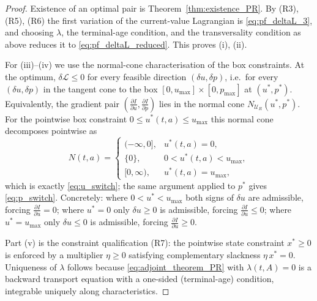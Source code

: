 \documentclass[10pt,a4paper]{amsart}
\begin{document}
\begin{proof}
Existence of an optimal pair is Theorem~\ref{thm:existence_PR}. By (R3),
(R5), (R6) the first variation of the current-value Lagrangian is
\eqref{eq:pf_deltaL_3}, and choosing $\lambda$, the terminal-age condition,
and the transversality condition as above reduces it to
\eqref{eq:pf_deltaL_reduced}. This proves (i), (ii).

For (iii)--(iv) we use the normal-cone characterisation of the box
constraints. At the optimum,
$\delta\mathcal L\le0$ for every feasible direction $(\delta u,\delta p)$,
i.e.\ for every $(\delta u,\delta p)$ in the tangent cone to the box
$[0,u_{\max}]\times[0,p_{\max}]$ at $(u^\ast,p^\ast)$. Equivalently, the
gradient pair $(\frac{\partial I}{\partial u},\frac{\partial I}{\partial p})$
lies in the normal cone $N_{\mathcal U_R}(u^\ast,p^\ast)$. For the pointwise
box constraint $0\le u^\ast(t,a)\le u_{\max}$ this normal cone decomposes
pointwise as
\[
N(t,a)=\begin{cases}
(-\infty,0], & u^\ast(t,a)=0,\\
\{0\}, & 0<u^\ast(t,a)<u_{\max},\\
[0,\infty), & u^\ast(t,a)=u_{\max},
\end{cases}
\]
which is exactly \eqref{eq:u_switch}; the same argument applied to
$p^\ast$ gives \eqref{eq:p_switch}. Concretely: where $0<u^\ast<u_{\max}$ both
signs of $\delta u$ are admissible, forcing
$\frac{\partial I}{\partial u}=0$; where $u^\ast=0$ only $\delta u\ge0$ is
admissible, forcing $\frac{\partial I}{\partial u}\le0$; where
$u^\ast=u_{\max}$ only $\delta u\le0$ is admissible, forcing
$\frac{\partial I}{\partial u}\ge0$.

Part (v) is the constraint qualification (R7): the pointwise state constraint
$x^\ast\ge0$ is enforced by a multiplier $\eta\ge0$ satisfying complementary
slackness $\eta\,x^\ast=0$. Uniqueness of $\lambda$ follows because
\eqref{eq:adjoint_theorem_PR} with $\lambda(t,A)=0$ is a backward transport
equation with a one-sided (terminal-age) condition, integrable uniquely along
characteristics.
\end{proof}
\end{document}
